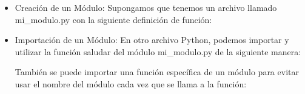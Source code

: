 \begin{itemize}
    \item Creación de un Módulo: Supongamos que tenemos un archivo llamado mi\_modulo.py con la siguiente definición de función:
    \begin{figure}[h]
        \centering
      \end{figure}

    \item Importación de un Módulo: En otro archivo Python, podemos importar y utilizar la función saludar del módulo mi\_modulo.py de la siguiente manera:
    \begin{figure}[h]
        \centering
      \end{figure}
      
      También se puede importar una función específica de un módulo para evitar usar el nombre del módulo cada vez que se llama a la función:

      \begin{figure}[h]
        \centering
      \end{figure}
    \end{itemize}
      
